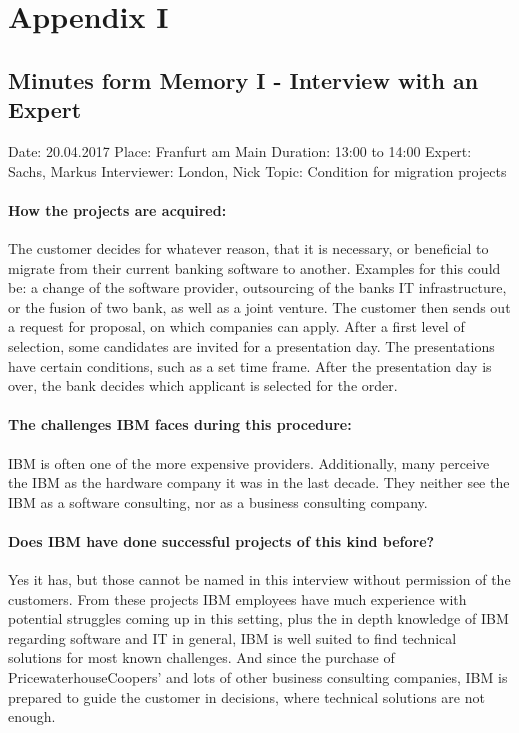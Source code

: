 \section*{Appendix I}
\subsection*{Minutes form Memory I - Interview with an Expert}
Date: 20.04.2017
Place: Franfurt am Main
Duration: 13:00 to 14:00
Expert: Sachs, Markus
Interviewer: London, Nick
Topic: Condition for migration projects
\paragraph{How the projects are acquired:}
The customer decides for whatever reason, that it is necessary, or beneficial to migrate from their current banking software to another. Examples for this could be: a change of the software provider, outsourcing of the banks IT infrastructure, or the fusion of two bank, as well as a joint venture. The customer then sends out a request for proposal, on which companies can apply. After a first level of selection, some candidates are invited for a presentation day. The presentations have certain conditions, such as a set time frame. After the presentation day is over, the bank decides which applicant is selected for the order.
\paragraph{The challenges IBM faces during this procedure:}
IBM is often one of the more expensive providers. Additionally, many perceive the IBM as the hardware company it was in the last decade. They neither see the IBM as a software consulting, nor as a business consulting company.
\paragraph{Does IBM have done successful projects of this kind before?} Yes it has, but those cannot be named in this interview without permission of the customers. From these projects IBM employees have much experience with potential struggles coming up in this setting, plus the in depth knowledge of IBM regarding software and IT in general, IBM is well suited to find technical solutions for most known challenges. And since the purchase of PricewaterhouseCoopers' and lots of other business consulting companies, IBM is prepared to guide the customer in decisions, where technical solutions are not enough.

